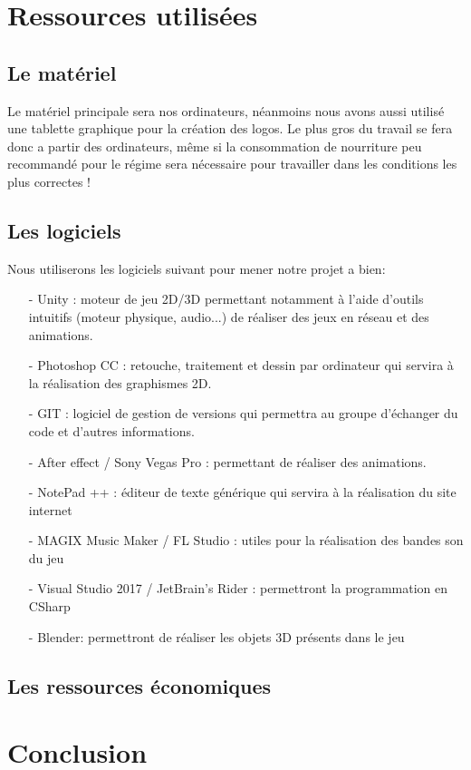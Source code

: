 \documentclass[12pt,a4paper]{article}
\begin{document}
\section{Ressources utilisées}
\subsection{Le matériel}
Le matériel principale sera nos ordinateurs, néanmoins nous avons aussi utilisé une tablette graphique
pour la création des logos.
Le plus gros du travail se fera donc a partir des ordinateurs, même si la consommation de nourriture
peu recommandé pour le régime sera nécessaire pour travailler dans les conditions les plus correctes !
\subsection{Les logiciels}
Nous utiliserons les logiciels suivant pour mener notre projet a bien:
\begin{itemize}
\item[-] Unity : moteur de jeu 2D/3D permettant notamment à l'aide d'outils
intuitifs (moteur physique, audio...) de réaliser des jeux en réseau et
des animations.
\item[-] Photoshop CC : retouche, traitement et dessin par
ordinateur qui servira à la réalisation des graphismes 2D.
\item[-] GIT : logiciel de gestion de versions qui permettra au groupe d'échanger du code et d’autres informations.
\item[-] After effect / Sony Vegas Pro : permettant de réaliser des animations.
\item[-] NotePad ++ : éditeur de texte générique qui servira à la réalisation
du site internet
\item[-] MAGIX Music Maker / FL Studio : utiles pour la
réalisation des bandes son du jeu
\item[-] Visual Studio 2017 / JetBrain's Rider : permettront la programmation en CSharp
\item[-] Blender: permettront de réaliser les objets 3D présents dans le jeu
\end{itemize}
\subsection{Les ressources économiques}

\newpage
\section{Conclusion}	
\end{document}
